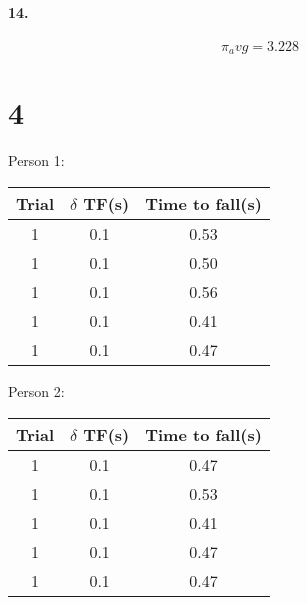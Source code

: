     \paragraph*{14.}
    \begin{equation*}
        \pi_avg = 3.228
    \end{equation*}

    \section*{4}

    \begin{center}
        Person 1:
        \begin{tabular}{| c | c | c |}
            \hline
            Trial & $\delta$ TF(s) & Time to fall(s)        \\
            \hline
            1 & 0.1 & 0.53                                  \\
            \hline
            1 & 0.1 & 0.50                                  \\
            \hline
            1 & 0.1 & 0.56                                  \\
            \hline
            1 & 0.1 & 0.41                                  \\
            \hline
            1 & 0.1 & 0.47                                  \\
            \hline
        \end{tabular}

        Person 2:
        \begin{tabular}{| c | c | c |}
            \hline
            Trial & $\delta$ TF(s) & Time to fall(s)        \\
            \hline
            1 & 0.1 & 0.47                                  \\
            \hline
            1 & 0.1 & 0.53                                  \\
            \hline
            1 & 0.1 & 0.41                                  \\
            \hline
            1 & 0.1 & 0.47                                  \\
            \hline
            1 & 0.1 & 0.47                                  \\
            \hline
        \end{tabular}


\end{center}
